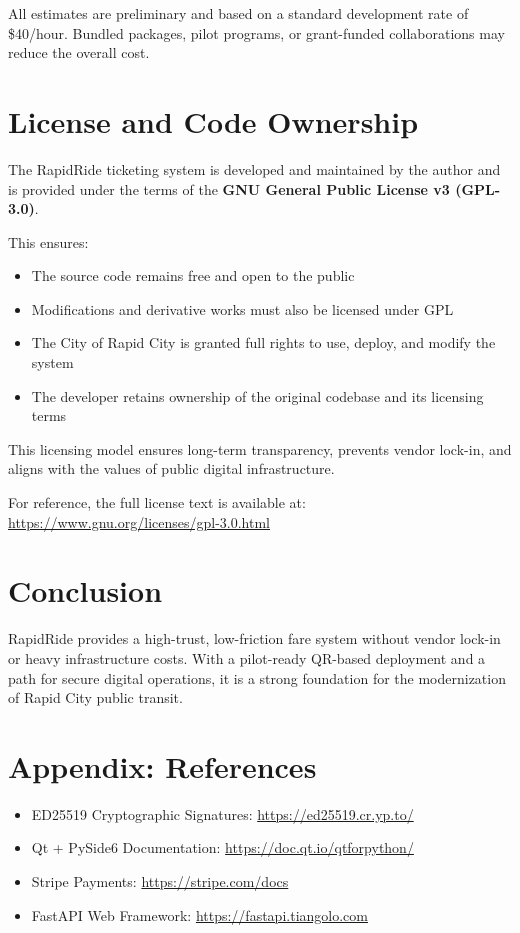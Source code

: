 \documentclass[12pt]{article}
\begin{document}
\vspace{1em}
\noindent All estimates are preliminary and based on a standard development rate of \$40/hour. Bundled packages, pilot programs, or grant-funded collaborations may reduce the overall cost.


\section{License and Code Ownership}

The RapidRide ticketing system is developed and maintained by the author and is provided under the terms of the \textbf{GNU General Public License v3 (GPL-3.0)}.

This ensures:
\begin{itemize}
    \item The source code remains free and open to the public
    \item Modifications and derivative works must also be licensed under GPL
    \item The City of Rapid City is granted full rights to use, deploy, and modify the system
    \item The developer retains ownership of the original codebase and its licensing terms
\end{itemize}

This licensing model ensures long-term transparency, prevents vendor lock-in, and aligns with the values of public digital infrastructure.

For reference, the full license text is available at: \url{https://www.gnu.org/licenses/gpl-3.0.html}



\section{Conclusion}
RapidRide provides a high-trust, low-friction fare system without vendor lock-in or heavy infrastructure costs. With a pilot-ready QR-based deployment and a path for secure digital operations, it is a strong foundation for the modernization of Rapid City public transit.

\appendix
\section{Appendix: References}
\begin{itemize}
    \item ED25519 Cryptographic Signatures: \url{https://ed25519.cr.yp.to/}
    \item Qt + PySide6 Documentation: \url{https://doc.qt.io/qtforpython/}
    \item Stripe Payments: \url{https://stripe.com/docs}
    \item FastAPI Web Framework: \url{https://fastapi.tiangolo.com}
\end{itemize}
\end{document}

